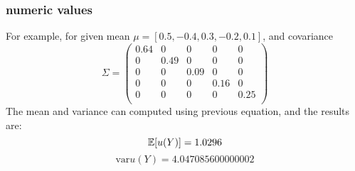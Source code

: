 \subsubsection{numeric values}
For example, for given mean $\mu = [0.5, -0.4, 0.3, -0.2, 0.1]$, and covariance 
\begin{equation}
\Sigma = 
\begin{pmatrix} 
0.64 & 0 & 0 & 0 & 0 \\ 
0 & 0.49 & 0 & 0 & 0 \\ 
0 & 0 & 0.09 & 0 & 0 \\ 
0 & 0 & 0 & 0.16 & 0 \\ 
0 & 0 & 0 & 0 & 0.25 \\ 
\end{pmatrix} 
\end{equation}
The mean and variance can computed using previous equation, and the results are:
\begin{equation}
\mathbb{E}[ u(Y)] = 1.0296
\end{equation}
\begin{equation}
\text{var}{u(Y)} = 4.047085600000002
\end{equation}
